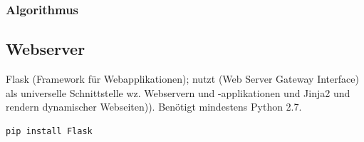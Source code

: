 \subsubsection{Algorithmus}





\subsection{Webserver}

Flask (Framework für Webapplikationen); nutzt  (Web Server Gateway Interface) als universelle Schnittstelle wz. Webservern und -applikationen und Jinja2 und rendern dynamischer Webseiten)). Benötigt mindestens Python 2.7.

\begin{lstlisting}
pip install Flask
\end{lstlisting}






















\newpage









